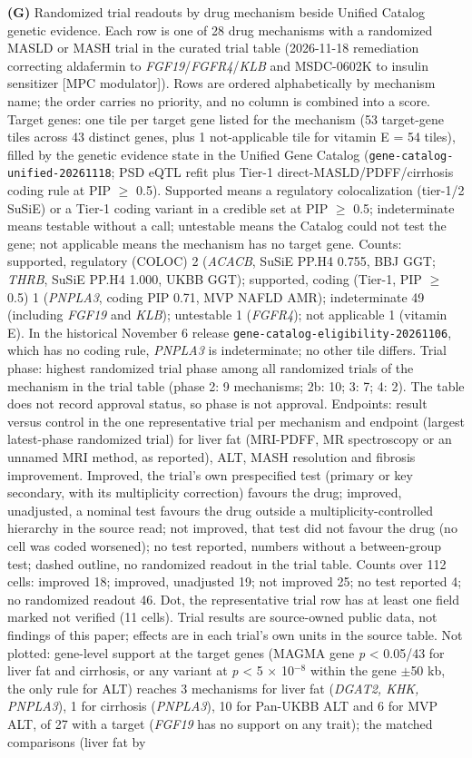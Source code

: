 \textbf{(G)} Randomized trial readouts by drug mechanism beside Unified Catalog genetic evidence. Each row is one of 28 drug mechanisms with a randomized MASLD or MASH trial in the curated trial table (2026-11-18 remediation correcting aldafermin to \emph{FGF19}/\emph{FGFR4}/\emph{KLB} and MSDC-0602K to insulin sensitizer [MPC modulator]). Rows are ordered alphabetically by mechanism name; the order carries no priority, and no column is combined into a score. Target genes: one tile per target gene listed for the mechanism (53 target-gene tiles across 43 distinct genes, plus 1 not-applicable tile for vitamin E = 54 tiles), filled by the genetic evidence state in the Unified Gene Catalog (\texttt{gene-catalog-unified-20261118}; PSD eQTL refit plus Tier-1 direct-MASLD/PDFF/cirrhosis coding rule at PIP $\ge$ 0.5). Supported means a regulatory colocalization (tier-1/2 SuSiE) or a Tier-1 coding variant in a credible set at PIP $\ge$ 0.5; indeterminate means testable without a call; untestable means the Catalog could not test the gene; not applicable means the mechanism has no target gene. Counts: supported, regulatory (COLOC) 2 (\emph{ACACB}, SuSiE PP.H4 0.755, BBJ GGT; \emph{THRB}, SuSiE PP.H4 1.000, UKBB GGT); supported, coding (Tier-1, PIP $\ge$ 0.5) 1 (\emph{PNPLA3}, coding PIP 0.71, MVP NAFLD AMR); indeterminate 49 (including \emph{FGF19} and \emph{KLB}); untestable 1 (\emph{FGFR4}); not applicable 1 (vitamin E). In the historical November 6 release \texttt{gene-catalog-eligibility-20261106}, which has no coding rule, \emph{PNPLA3} is indeterminate; no other tile differs. Trial phase: highest randomized trial phase among all randomized trials of the mechanism in the trial table (phase 2: 9 mechanisms; 2b: 10; 3: 7; 4: 2). The table does not record approval status, so phase is not approval. Endpoints: result versus control in the one representative trial per mechanism and endpoint (largest latest-phase randomized trial) for liver fat (MRI-PDFF, MR spectroscopy or an unnamed MRI method, as reported), ALT, MASH resolution and fibrosis improvement. Improved, the trial's own prespecified test (primary or key secondary, with its multiplicity correction) favours the drug; improved, unadjusted, a nominal test favours the drug outside a multiplicity-controlled hierarchy in the source read; not improved, that test did not favour the drug (no cell was coded worsened); no test reported, numbers without a between-group test; dashed outline, no randomized readout in the trial table. Counts over 112 cells: improved 18; improved, unadjusted 19; not improved 25; no test reported 4; no randomized readout 46. Dot, the representative trial row has at least one field marked not verified (11 cells). Trial results are source-owned public data, not findings of this paper; effects are in each trial's own units in the source table. Not plotted: gene-level support at the target genes (MAGMA gene \emph{p} \textless{} 0.05/43 for liver fat and cirrhosis, or any variant at \emph{p} \textless{} 5 $\times$ 10$^{-8}$ within the gene $\pm$50 kb, the only rule for ALT) reaches 3 mechanisms for liver fat (\emph{DGAT2, KHK, PNPLA3}), 1 for cirrhosis (\emph{PNPLA3}), 10 for Pan-UKBB ALT and 6 for MVP ALT, of 27 with a target (\emph{FGF19} has no support on any trait); the matched comparisons (liver fat by 
